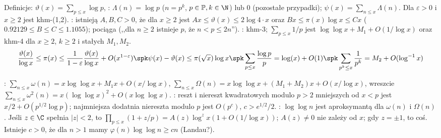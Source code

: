 Definicje:  $\vartheta(x) = \sum_{p \le x} \log p$, : $\Lambda(n) = \log p$ ($n = p^k$, $p \in \mathbb P, k \in \N$) lub $0$ (pozostałe przypadki); $\psi(x) = \sum_{n \le x} \Lambda(n)$.
Dla $\varepsilon > 0$ i $x \ge 2$ jest khm-(1,2).
: istnieją $A, B, C > 0$, że dla $x \ge 2$ jest $Ax \le \vartheta (x) \le 2 \log 4 \cdot x$ oraz $B x \le \pi(x)\log x \le C x$ ($0.92129 \le B \le C \le 1.1055$); pociąga  (,,dla $n \ge 2$ istnieje $p$, że $n < p \le 2n$'').
: khm-3; $\sum_{p \le x} 1/p$ jest $\log \log x + M_1 + O(1/\log x)$ oraz khm-4 dla $x \ge 2$, $k \ge 2$ i stałych $M_1, M_2$.
\[
	\frac{\vartheta(x)}{\log x} \le \pi (x) \le \frac{1}{1-\varepsilon} \frac{\vartheta (x)}{\log x} + O(x^{1- \varepsilon}) \spk
	\psi (x) - \vartheta(x) \le \pi(\sqrt{x}) \log x \spk
	\sum_{p \le x} \frac{\log p} p = \log (x) + O(1) \spk
	\sum_{p^k \le x} \frac 1 {p^k} = M_2 + O(\log^{-1} x)
\]

:  $\sum_{n \le x} \omega(n) = x \log \log x + M_1 x + O(x / \log x)$, $\sum_{n \le x} \Omega(n) = x \log \log x + (M_1+M_2)x + O(x / \log x)$, wreszcie $\sum_{n \le x}\omega^2(n) = x  (\log \log x)^2 + O(x \log \log x)$.
: reszt i niereszt kwadratowych modulo $p > 2$ mniejszych od $x < p$ jest $x/2 + O(p^{1/2} \log p)$; najmniejsza dodatnia niereszta modulo $p$ jest $O(p^c)$, $c > e^{1/2} / 2$.
: $\log \log n$ jest aproksymantą dla $\omega(n)$ i $\Omega(n)$.
Jeśli $z \in \C$ spełnia $|z| < 2$, to $\prod_{p \le x} (1+z/p) = A(z)\log^z x(1 + O(1/\log x))$;  $A(z) \neq 0$ nie zależy od $x$; gdy $z = \pm 1$, to coś.
Istnieje $c > 0$, że dla $n > 1$ mamy $\varphi(n) \log \log n \ge c n$ (Landau?).



